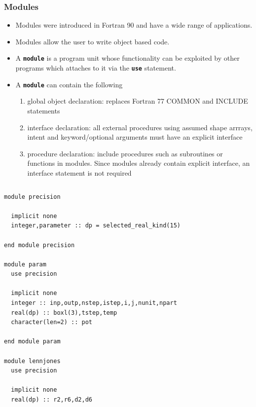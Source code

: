 \documentclass[slidestop,mathserif,compress,xcolor=svgnames]{beamer}
\newenvironment{eblock}[0]
{
\begin{beamerboxesrounded}[upper=uppercol2,lower=lowercol2,shadow=true]}
{\end{beamerboxesrounded}}
\begin{document}
\begin{frame}
  \frametitle{\small Modules}
  \begin{itemize}
    \item Modules were introduced in Fortran 90 and have a wide range of applications.
    \item Modules allow the user to write object based code.
    \item A \textbf{\texttt{module}} is a program unit whose functionality can be exploited by other programs which attaches to it via the \textbf{\texttt{use}} statement.
    \item A \textbf{\texttt{module}} can contain the following
    \begin{enumerate}
      \item global object declaration: replaces Fortran 77 COMMON and INCLUDE statements
      \item interface declaration: all external procedures using assumed shape arrrays, intent and keyword/optional arguments must have an explicit interface
      \item procedure declaration: include procedures such as subroutines or functions in modules. Since modules already contain explicit interface, an interface statement is not required
    \end{enumerate}
  \end{itemize}
  \framebreak
  {\fontsize{4}{5}
    \begin{columns}
      \column{5.5cm}
      \vspace{-0.5cm}
      \begin{eblock}{}
        \begin{verbatim}
module precision

  implicit none
  integer,parameter :: dp = selected_real_kind(15)

end module precision

module param
  use precision

  implicit none
  integer :: inp,outp,nstep,istep,i,j,nunit,npart
  real(dp) :: boxl(3),tstep,temp
  character(len=2) :: pot

end module param

module lennjones
  use precision

  implicit none
  real(dp) :: r2,r6,d2,d6
  

\end{verbatim}
\end{eblock}
\end{columns}}
\end{frame}
\end{document}
